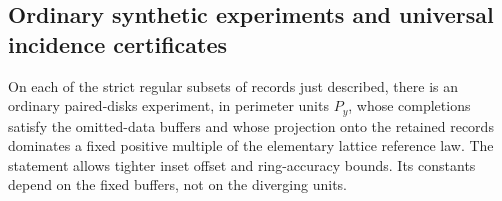 \subsection{Ordinary synthetic experiments and universal incidence certificates}

\begin{lemma}\label{end:synthetic-domination}
On each of the strict regular subsets of records just described, there is an
ordinary paired-disks experiment, in perimeter units $P_y$, whose completions
satisfy the omitted-data buffers and whose projection onto the retained records
dominates a fixed positive multiple of the elementary lattice reference law.
The statement allows tighter inset offset and ring-accuracy bounds. Its constants
depend on the fixed buffers, not on the diverging units.
\end{lemma}

